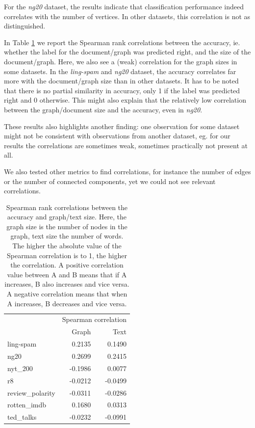 For the \textit{ng20} dataset, the results indicate that classification performance indeed correlates with the number of vertices.
In other datasets, this correlation is not as distinguished.
\fi

In Table \ref{table:correlations_size} we report the Spearman rank correlations \cite{Hauke2011} between the accuracy, ie. whether the label for the document/graph was predicted right, and the size of the document/graph.
Here, we also see a (weak) correlation for the graph sizes in some datasets.
In the \textit{ling-spam} and \textit{ng20} dataset, the accuracy correlates far more with the document/graph size than in other datasets.
It has to be noted that there is no partial similarity in accuracy, only 1 if the label was predicted right and 0 otherwise.
This might also explain that the relatively low correlation between the graph/document size and the accuracy, even in \textit{ng20}.

These results also highlights another finding: one observation for some dataset might not be consistent with observations from another dataset, eg. for our results the correlations are sometimes weak, sometimes practically not present at all.

We also tested other metrics to find correlations, for instance the number of edges or the number of connected components, yet we could not see relevant correlations.

\begin{table}[htb!]
    \centering
    \begin{tabular}{lrr}
\toprule
        &  \multicolumn{2}{c}{Spearman correlation} \\
        &  Graph &  Text \\
        \midrule
        ling-spam       &  0.2135 &  0.1490 \\
        ng20            &  0.2699 &  0.2415 \\
        nyt\_200         & -0.1986 &  0.0077 \\
        r8              & -0.0212 & -0.0499 \\
        review\_polarity & -0.0311 & -0.0286 \\
        rotten\_imdb     &  0.1680 &  0.0313 \\
        ted\_talks       & -0.0232 & -0.0991 \\
        \bottomrule
    \end{tabular}
    \caption[Table: Graph/text size correlations]{Spearman rank correlations between the accuracy and graph/text size. Here, the graph size is the number of nodes in the graph, text size the number of words. The higher the absolute value of the Spearman correlation is to 1, the higher the correlation.
    A positive correlation value between A and B means that if A increases, B also increases and vice versa.
    A negative correlation means that when A increases, B decreases and vice versa.}%
    \label{table:correlations_size}
\end{table}

